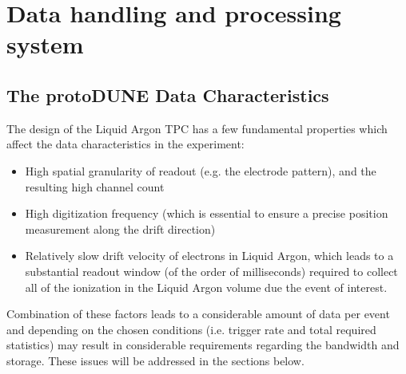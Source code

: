 \section{Data handling and processing system}

\subsection{The protoDUNE Data Characteristics}

The design of the Liquid Argon TPC has a few fundamental properties which affect the data characteristics in the experiment:
\begin{itemize}
\item High spatial granularity of readout (e.g. the electrode pattern), and the resulting high channel count
\item High digitization frequency (which is essential to ensure a precise position measurement along the drift direction)
\item Relatively slow drift velocity of electrons in Liquid Argon, which  leads to a substantial readout window (of the order of milliseconds) required to collect
all of the ionization in the Liquid Argon volume due the event of interest. 
\end{itemize}

\noindent
Combination of these factors leads to a considerable amount of data per event and depending on
the chosen conditions (i.e. trigger rate and total required statistics) may result in considerable requirements
regarding the bandwidth and storage. These issues will be addressed in the sections below.





